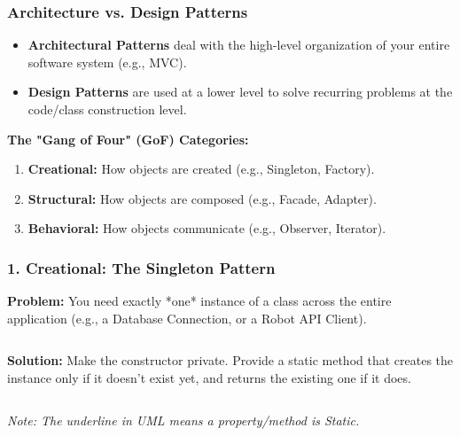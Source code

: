 \documentclass[xcolor=table]{beamer}
\begin{document}
\begin{frame}
    \frametitle{Architecture vs. Design Patterns}
    \begin{itemize}
        \item \textbf{Architectural Patterns} deal with the high-level organization of your entire software system (e.g., MVC).
        \item \textbf{Design Patterns} are used at a lower level to solve recurring problems at the code/class construction level.
    \end{itemize}
    \vspace{0.3cm}
    \textbf{The "Gang of Four" (GoF) Categories:}
    \begin{enumerate}
        \item \textbf{Creational:} How objects are created (e.g., Singleton, Factory).
        \item \textbf{Structural:} How objects are composed (e.g., Facade, Adapter).
        \item \textbf{Behavioral:} How objects communicate (e.g., Observer, Iterator).
    \end{enumerate}
\end{frame}

\begin{frame}[fragile]
    \frametitle{1. Creational: The Singleton Pattern}
    \textbf{Problem:} You need exactly *one* instance of a class across the entire application (e.g., a Database Connection, or a Robot API Client).
    
    \vspace{0.2cm}
    \begin{columns}
        \textbf{Solution:}
        Make the constructor private. Provide a static method that creates the instance only if it doesn't exist yet, and returns the existing one if it does.
        
        \centering
    \end{columns}
    \vspace{0.4cm}
    \textit{Note: The underline in UML means a property/method is Static.}
\end{frame}
\end{document}

